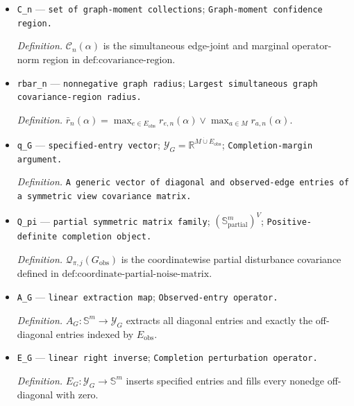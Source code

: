 \documentclass{article}
\begin{document}
\begin{itemize}
  \par\smallskip\noindent\emph{Definition.} \(d_{\mathrm{obs}}\) is the maximum edge-joint and marginal block operator-norm metric in \(\text{def:local-stability-modulus}\).
  \item \texttt{C\_\allowbreak{}n} --- \texttt{set of graph-\allowbreak{}moment collections}; \texttt{Graph-\allowbreak{}moment confidence region.}
  \par\smallskip\noindent\emph{Definition.} \(\mathcal C_n(\alpha)\) is the simultaneous edge-joint and marginal operator-norm region in \(\text{def:covariance-region}\).
  \item \texttt{rbar\_\allowbreak{}n} --- \texttt{nonnegative graph radius}; \texttt{Largest simultaneous graph covariance-\allowbreak{}region radius.}
  \par\smallskip\noindent\emph{Definition.} \(\bar r_n(\alpha)=\max_{e\in E_{\mathrm{obs}}}r_{e,n}(\alpha)\vee\max_{a\in M}r_{a,n}(\alpha)\).
  \item \texttt{q\_\allowbreak{}G} --- \texttt{specified-\allowbreak{}entry vector}; \(\mathcal Y_G=\mathbb R^{M\mathbin{\dot\cup}E_{\mathrm{obs}}}\); \texttt{Completion-\allowbreak{}margin argument.}
  \par\smallskip\noindent\emph{Definition.} \texttt{A generic vector of diagonal and observed-\allowbreak{}edge entries of a symmetric view covariance matrix.}
  \item \texttt{Q\_\allowbreak{}pi} --- \texttt{partial symmetric matrix family}; \((\mathbb S_{\mathrm{partial}}^m)^V\); \texttt{Positive-\allowbreak{}definite completion object.}
  \par\smallskip\noindent\emph{Definition.} \(\mathcal Q_{\pi,j}(G_{\mathrm{obs}})\) is the coordinatewise partial disturbance covariance defined in \(\text{def:coordinate-partial-noise-matrix}\).
  \item \texttt{A\_\allowbreak{}G} --- \texttt{linear extraction map}; \texttt{Observed-\allowbreak{}entry operator.}
  \par\smallskip\noindent\emph{Definition.} \(A_G:\mathbb S^m\to\mathcal Y_G\) extracts all diagonal entries and exactly the off-diagonal entries indexed by \(E_{\mathrm{obs}}\).
  \item \texttt{E\_\allowbreak{}G} --- \texttt{linear right inverse}; \texttt{Completion perturbation operator.}
  \par\smallskip\noindent\emph{Definition.} \(E_G:\mathcal Y_G\to\mathbb S^m\) inserts specified entries and fills every nonedge off-diagonal with zero.

\end{itemize}
\end{document}
